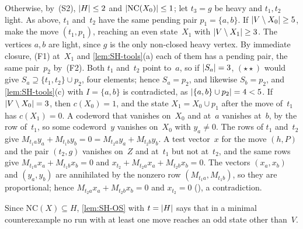 \begin{outline}
Otherwise, by~(S2), $\lvert H \rvert\le2$ and $\lvert \mathrm{NC}(X_0) \rvert\le1$; let $t_3=g$ be heavy and $t_1,t_2$ light. As above,
$t_1$ and~$t_2$ have the same pending pair $p_1=\{a,b\}$. If $\lvert V\setminus X_0 \rvert\ge5$, make the move $(t_1,p_1)$, reaching an
even state~$X_1$ with $\lvert V\setminus X_1 \rvert\ge3$. The vertices $a,b$ are light, since $g$ is the only non-closed heavy vertex.
By immediate closure, (F1) at~$X_1$ and \cref{lem:SH-tools}(a) each of them has a pending pair, the same pair~$p_2$
by~(F2). Both $t_1$ and~$t_2$ point
to~$a$, so if $\lvert S_a \rvert=3$, $(\star\star)$ would give $S_a\supseteq\{t_1,t_2\}\cup p_2$, four elements; hence $S_a=p_2$, and
likewise $S_b=p_2$, and \cref{lem:SH-tools}(c) with $I=\{a,b\}$ is contradicted, as $\lvert \{a,b\}\cup p_2 \rvert=4<5$. If
$\lvert V\setminus X_0 \rvert=3$, then $c(X_0)=1$, and the state $X_1=X_0\cup p_1$ after the move of~$t_1$ has $c(X_1)=0$. A codeword
that vanishes on~$X_0$ and at~$a$ vanishes at~$b$, by the row of~$t_1$, so some codeword~$y$ vanishes on~$X_0$ with $y_a\ne0$. The
rows of $t_1$ and~$t_2$ give $M_{t_1a}y_a+M_{t_1b}y_b=0=M_{t_2a}y_a+M_{t_2b}y_b$. A test vector~$x$ for the move $(h,P)$ and the
pair $(t_2,g)$ vanishes on~$Z$ and at~$t_1$ but not at~$t_2$, and the same rows give $M_{t_1a}x_a+M_{t_1b}x_b=0$ and
$x_{t_2}+M_{t_2a}x_a+M_{t_2b}x_b=0$. The vectors $(x_a,x_b)$ and $(y_a,y_b)$ are annihilated by the nonzero row
$(M_{t_1a},M_{t_1b})$, so they are proportional; hence $M_{t_2a}x_a+M_{t_2b}x_b=0$ and $x_{t_2}=0$ (), a
contradiction.
\end{outline}

Since $\mathrm{NC}(X)\subseteq H$, \cref{lem:SH-OS} with $t=\lvert H \rvert$ says that in a minimal counterexample no run with at least
one move reaches an odd state other than~$V$.

